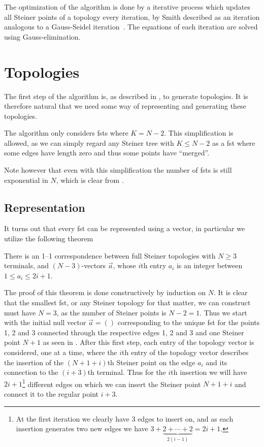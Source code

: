 The optimization of the algorithm is done by a iterative process which updates
all Steiner points of a topology every iteration, by Smith described as an
iteration analogous to a Gauss-Seidel iteration~\cite[p.~145]{Smith1992}.  The
equations of each iteration are solved using Gauss-elimination.


\section{Topologies}
\label{sec:topologies}

The first step of the algorithm is, as described in , to
generate topologies.  It is therefore natural that we need some way of
representing and generating these topologies.

The algorithm only considers \glspl{fst} where $K = N - 2$.  This simplification
is allowed, as we can simply regard any Steiner tree with $K \le N - 2$ as a
\gls{fst} where some edges have length zero and thus some points have
``merged''.

Note however that even with this simplification the number of \glspl{fst} is
still exponential in $N$, which is clear from .

\subsection{Representation}
\label{sec:representation}

It turns out that every \gls{fst} can be represented using a vector, in
particular we utilize the following theorem

\begin{theorem} There is an 1--1 correspondence between full Steiner topologies
with $N \ge 3$ terminals, and $(N-3)$-vectors $\vec{a}$, whose $i$th entry $a_i$
is an integer between $1 \le a_i \le 2 i + 1$.
\end{theorem}

The proof of this theorem is done constructively by induction on $N$.  It is
clear that the smallest \gls{fst}, or any Steiner topology for that matter, we
can construct must have $N = 3$, as the number of Steiner points is $N - 2 = 1$.
Thus we start with the initial null vector $\vec{a} = ()$ corresponding to the
unique \gls{fst} for the points 1, 2 and 3 connected through the respective
edges 1, 2 and 3 and one Steiner point $N+1$ as seen in
.  After this first step, each entry of the
topology vector is considered, one at a time, where the $i$th entry of the
topology vector describes the insertion of the $(N+1+i)$th Steiner point on the
edge $a_{i}$ and its connection to the $(i+3)$th terminal.  Thus for the $i$th
insertion we will have $2i+1$\footnote{At the first iteration we clearly have 3
edges to insert on, and as each insertion generates two new edges we have $3 +
\underbrace{2 + \cdots + 2}_{2 (i - 1)} = 2 i + 1$.} different edges on which we
can insert the Steiner point $N+1+i$ and connect it to the regular point $i+3$.

